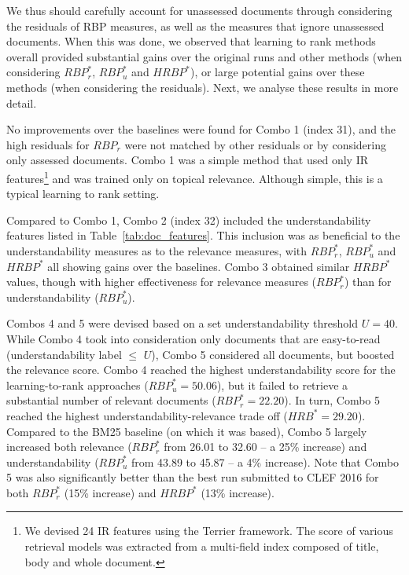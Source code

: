 
We thus should carefully account for unassessed documents through considering the residuals of RBP measures, as well as the measures that ignore unassessed documents. When this was done, we observed that learning to rank methods overall provided substantial gains over the original runs and other methods (when considering $RBP^*_r$, $RBP^*_u$ and $HRBP^*$), or large potential gains over these methods (when considering the residuals). Next, we analyse these results in more detail. 

No improvements over the baselines were found for Combo 1 (index 31), and the high residuals for $RBP_r$ were not matched by other residuals or by considering only assessed documents. Combo 1 was a simple method that used only IR features\footnote{We devised 24 IR features using the Terrier framework. The score of various retrieval models was extracted from a multi-field index composed of title, body and whole document.} and was trained only on topical relevance. Although simple, this is a typical learning to rank setting.

Compared to Combo 1, Combo 2 (index 32) included the understandability features listed in Table~\ref{tab:doc_features}. This inclusion was as beneficial to the understandability measures as to the relevance measures, with $RBP_r^*$, $RBP_u^*$ and $HRBP^*$ all showing gains over the baselines. Combo 3 obtained similar $HRBP^*$ values, though with higher effectiveness for relevance measures ($RBP_r^*$) than for understandability ($RBP_u^*$).


Combos 4 and 5 were devised based on a set understandability threshold $U=40$. While Combo 4 took into consideration only documents that are easy-to-read (understandability label $\le$ $U$), Combo 5 considered all documents, but boosted the relevance score. Combo 4 reached the highest understandability score for the learning-to-rank approaches ($RBP_u^{*}=50.06$), but it failed to retrieve a substantial number of relevant documents ($RBP_r^{*}=22.20$). In turn, Combo 5 reached the highest understandability-relevance trade off ($HRB^{*}=29.20$). Compared to the BM25 baseline (on which it was based), Combo 5  largely increased both relevance ($RBP_r^*$ from 26.01 to 32.60 -- a 25\% increase) and understandability ($RBP_u^*$ from 43.89 to 45.87 -- a 4\% increase). Note that Combo 5 was also significantly better than the best run submitted to CLEF 2016 for both $RBP_r^{*}$ (15\% increase) and $HRBP^{*}$ (13\% increase).


